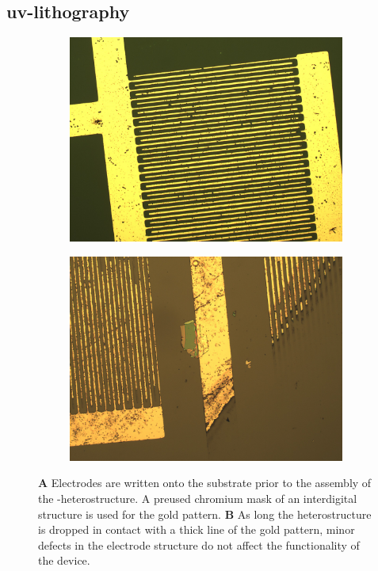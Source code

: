\subsection{uv-lithography}

\begin{figure}
\centering
\begin{subfigure}{0.4\textwidth}
	\caption{}
	\includegraphics[width=\textwidth]{lithography.jpg}

\end{subfigure}
\begin{subfigure}{0.4\textwidth}
	\caption{}
	\includegraphics[width=\textwidth]{full_device.jpg}
\end{subfigure}
\caption{\textbf{A} Electrodes are written onto the substrate prior to the assembly of the \hbn-\tmdg heterostructure. A preused chromium mask of an interdigital structure is used for the gold pattern. \textbf{B} As long the heterostructure is dropped in contact with a thick line of the gold pattern, minor defects in the electrode structure do not affect the functionality of the device.}
	\label{pattern}
\end{figure}

